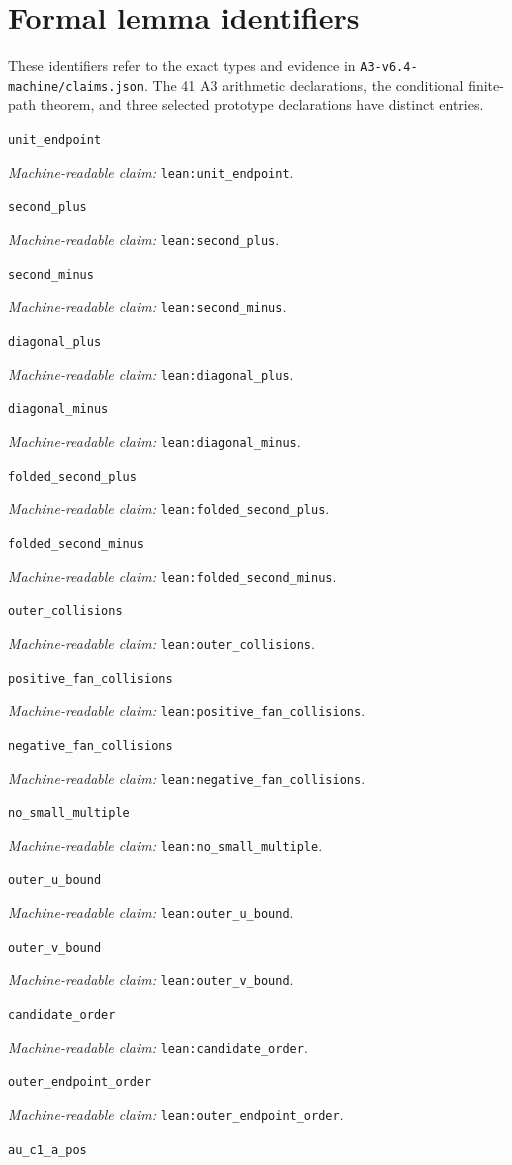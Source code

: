 \documentclass[11pt]{amsart}
\newcommand{\record}[1]{\nolinkurl{#1}}
\newcommand{\claimid}[1]{\par\nopagebreak\noindent\textit{Machine-readable claim:} \record{#1}.\par}
\begin{document}
\section*{Formal lemma identifiers}
These identifiers refer to the exact types and evidence in \record{A3-v6.4-machine/claims.json}.
The 41 A3 arithmetic declarations, the conditional finite-path theorem,
and three selected prototype declarations have distinct entries.
\par\noindent\label{lean:unit_endpoint}\record{unit_endpoint}
\claimid{lean:unit_endpoint}
\par\noindent\label{lean:second_plus}\record{second_plus}
\claimid{lean:second_plus}
\par\noindent\label{lean:second_minus}\record{second_minus}
\claimid{lean:second_minus}
\par\noindent\label{lean:diagonal_plus}\record{diagonal_plus}
\claimid{lean:diagonal_plus}
\par\noindent\label{lean:diagonal_minus}\record{diagonal_minus}
\claimid{lean:diagonal_minus}
\par\noindent\label{lean:folded_second_plus}\record{folded_second_plus}
\claimid{lean:folded_second_plus}
\par\noindent\label{lean:folded_second_minus}\record{folded_second_minus}
\claimid{lean:folded_second_minus}
\par\noindent\label{lean:outer_collisions}\record{outer_collisions}
\claimid{lean:outer_collisions}
\par\noindent\label{lean:positive_fan_collisions}\record{positive_fan_collisions}
\claimid{lean:positive_fan_collisions}
\par\noindent\label{lean:negative_fan_collisions}\record{negative_fan_collisions}
\claimid{lean:negative_fan_collisions}
\par\noindent\label{lean:no_small_multiple}\record{no_small_multiple}
\claimid{lean:no_small_multiple}
\par\noindent\label{lean:outer_u_bound}\record{outer_u_bound}
\claimid{lean:outer_u_bound}
\par\noindent\label{lean:outer_v_bound}\record{outer_v_bound}
\claimid{lean:outer_v_bound}
\par\noindent\label{lean:candidate_order}\record{candidate_order}
\claimid{lean:candidate_order}
\par\noindent\label{lean:outer_endpoint_order}\record{outer_endpoint_order}
\claimid{lean:outer_endpoint_order}
\par\noindent\label{lean:au_c1_a_pos}\record{au_c1_a_pos}
\end{document}
